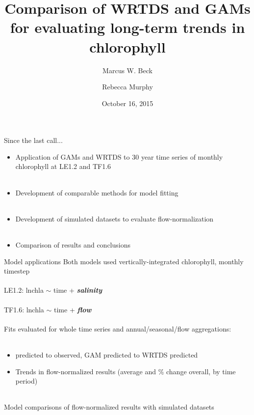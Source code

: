 \documentclass[serif]{beamer}\usepackage[]{graphicx}\usepackage[]{color}
\newcommand{\Bigtxt}[1]{\textbf{\textit{#1}}}
\begin{document}
\title[Comparison of WRTDS and GAMs]{Comparison of WRTDS and GAMs for evaluating long-term trends in chlorophyll}

\author[Beck, Murphy]{Marcus W. Beck \and Rebecca Murphy}

\date{October 16, 2015}


\begin{frame}
\titlepage
\end{frame}

\begin{frame}{Since the last call...}
\begin{itemize}
\item Application of GAMs and WRTDS to 30 year time series of monthly chlorophyll at LE1.2 and TF1.6 \\~\\
\item Development of comparable methods for model fitting \\~\\
\item Development of simulated datasets to evaluate flow-normalization \\~\\
\item Comparison of results and conclusions
\end{itemize}
\end{frame}

\begin{frame}{Model applications}
Both models used vertically-integrated chlorophyll, monthly timestep \\~\\
LE1.2: lnchla $\sim$ time + \Bigtxt{salinity} \\~\\
TF1.6: lnchla $\sim$ time + \Bigtxt{flow} \\~\\
Fits evaluated for whole time series and annual/seasonal/flow aggregations: \\~\\
\begin{itemize}
\item predicted to observed, GAM predicted to WRTDS predicted
\item Trends in flow-normalized results (average and \% change overall, by time period) \\~\\
\end{itemize}
Model comparisons of flow-normalized results with simulated datasets
\end{frame}
\end{document}
